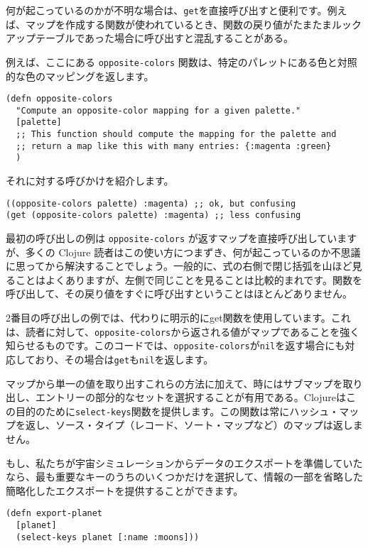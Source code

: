 何が起こっているのかが不明な場合は、\texttt{get}を直接呼び出すと便利です。例えば、マップを作成する関数が使われているとき、関数の戻り値がたまたまルックアップテーブルであった場合に呼び出すと混乱することがある。

例えば、ここにある \texttt{opposite-colors} 関数は、特定のパレットにある色と対照的な色のマッピングを返します。

\begin{lstlisting}[numbers=none]
(defn opposite-colors
  "Compute an opposite-color mapping for a given palette."
  [palette]
  ;; This function should compute the mapping for the palette and
  ;; return a map like this with many entries: {:magenta :green}
  )
\end{lstlisting}

それに対する呼びかけを紹介します。

\begin{lstlisting}[numbers=none]
((opposite-colors palette) :magenta) ;; ok, but confusing
(get (opposite-colors palette) :magenta) ;; less confusing
\end{lstlisting}

最初の呼び出しの例は \texttt{opposite-colors} が返すマップを直接呼び出していますが、多くの Clojure 読者はこの使い方につまずき、何が起こっているのか不思議に思ってから解決することでしょう。一般的に、式の右側で閉じ括弧を山ほど見ることはよくありますが、左側で同じことを見ることは比較的まれです。関数を呼び出して、その戻り値をすぐに呼び出すということはほとんどありません。

2番目の呼び出しの例では、代わりに明示的にget関数を使用しています。これは、読者に対して、\texttt{opposite-colors}から返される値がマップであることを強く知らせるものです。このコードでは、\texttt{opposite-colors}が\texttt{nil}を返す場合にも対応しており、その場合は\texttt{get}も\texttt{nil}を返します。

マップから単一の値を取り出すこれらの方法に加えて、時にはサブマップを取り出し、エントリーの部分的なセットを選択することが有用である。Clojureはこの目的のために\texttt{select-keys}関数を提供します。この関数は常にハッシュ・マップを返し、ソース・タイプ（レコード、ソート・マップなど）のマップは返しません。

もし、私たちが宇宙シミュレーションからデータのエクスポートを準備していたなら、最も重要なキーのうちのいくつかだけを選択して、情報の一部を省略した簡略化したエクスポートを提供することができます。

\begin{lstlisting}[numbers=none]
(defn export-planet
  [planet]
  (select-keys planet [:name :moons]))
\end{lstlisting}

